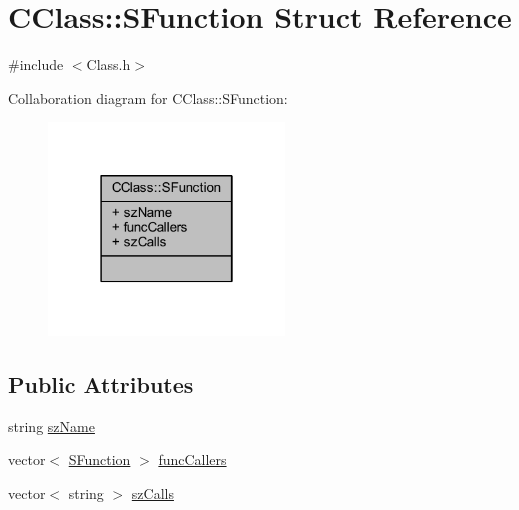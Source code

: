 \hypertarget{struct_c_class_1_1_s_function}{\section{C\+Class\+:\+:S\+Function Struct Reference}
\label{struct_c_class_1_1_s_function}
}


{\ttfamily \#include $<$Class.\+h$>$}



Collaboration diagram for C\+Class\+:\+:S\+Function\+:
\nopagebreak
\begin{figure}[H]
\begin{center}
\leavevmode
\includegraphics[width=178pt]{struct_c_class_1_1_s_function__coll__graph}
\end{center}
\end{figure}
\subsection*{Public Attributes}
\begin{DoxyCompactItemize}
\item 
string \hyperlink{struct_c_class_1_1_s_function_a709a1e1916aa5921620198effa41c8b5}{sz\+Name}
\item 
vector$<$ \hyperlink{struct_c_class_1_1_s_function}{S\+Function} $>$ \hyperlink{struct_c_class_1_1_s_function_a7ac14ba0820fd54ae22e34f2e88fe2e9}{func\+Callers}
\item 
vector$<$ string $>$ \hyperlink{struct_c_class_1_1_s_function_a389c0be3f14b06b53b919ba6e4eb7063}{sz\+Calls}
\end{DoxyCompactItemize}


